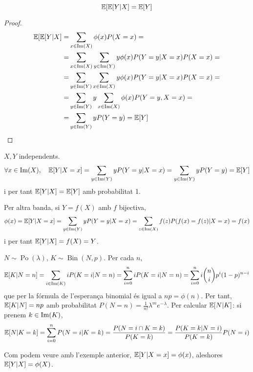 \begin{prop}
    \[\operatorname{\mathbb{E}}[\operatorname{\mathbb{E}}[Y \vert X] = \operatorname{\mathbb{E}}[Y]\]
\end{prop}

\begin{proof}
    \begin{align*}
    \operatorname{\mathbb{E}}[\operatorname{\mathbb{E}}[Y \vert X] = & \sum_{x\in\operatorname{Im}(X)} \phi(x)P(X=x) = \\
    = & \sum_{x\in\operatorname{Im}(X)} \sum_{y\in\operatorname{Im}(Y)} y\phi(x)P(Y=y \vert X=x)P(X=x) = \\
    = & \sum_{y\in\operatorname{Im}(Y)} \sum_{x\in\operatorname{Im}(X)} y\phi(x)P(Y=y \vert X=x)P(X=x) = \\
    = & \sum_{y\in\operatorname{Im}(Y)} y\sum_{x\in\operatorname{Im}(X)} \phi(x)P(Y=y,X=x) = \\
    = & \sum_{y\in\operatorname{Im}(Y)} y P(Y=y) = \operatorname{\mathbb{E}}[Y]
    \end{align*}
\end{proof}

\begin{obs}
    $X,Y$ independents. 
    \[\forall x \in\operatorname{Im}(X),\quad \operatorname{\mathbb{E}}[Y \vert X=x] = \sum_{y\in\operatorname{Im}(Y)} yP(Y=y \vert X=x) = \sum_{y\in\operatorname{Im}(Y)} yP(Y=y) = \operatorname{\mathbb{E}}[Y]\]
    i per tant $\operatorname{\mathbb{E}}[Y \vert X] = \operatorname{\mathbb{E}}[Y]$ amb probabilitat 1.
\end{obs}

\begin{obs}
    Per altra banda, si $Y=f(X)$ amb $f$ bijectiva,
    \[\phi(x) = \operatorname{\mathbb{E}}[Y\vert X=x] = \sum_{y\in\operatorname{Im}(Y)} yP(Y=y \vert X=x) = \sum_{z\in\operatorname{Im}(X)} f(z)P(f(x)=f(z) \vert X=x) = f(x)\]
    i per tant $\operatorname{\mathbb{E}}[Y \vert X] = f(X) = Y$.
\end{obs}

\begin{example}
    $N \sim \operatorname{Po}(\lambda)$, $K \sim \operatorname{Bin}(N,p)$.
    Per cada $n$,
    \[\operatorname{\mathbb{E}}[K \vert N=n] = \sum_{i\in\operatorname{Im}(K)} iP(K=i \vert N=n) = \sum_{i=0}^n iP(K=i \vert N=n) = \sum_{i=0}^n i\binom{n}{i}p^i(1-p)^{n-i}\]
    que per la fórmula de l'esperança binomial és igual a $np = \phi(n)$.
    Per tant, $\operatorname{\mathbb{E}}[K \vert N] = np$ amb probabilitat $P(N=n) = \frac{1}{n!}\lambda^me^{-\lambda}$.
    Per calcular $\operatorname{\mathbb{E}}[N \vert K]$: si prenem $k\in\operatorname{Im}(K)$,
    \[\operatorname{\mathbb{E}}[N|K=k] = \sum_{i=0}^nP(N=i \vert K=k) = \frac{P(N=i \cap K=k)}{P(K=k)} = \frac{P(K=k \vert N=i)}{P(K=k)}P(N=i)\]
\end{example}

\begin{obs}
    Com podem veure amb l'exemple anterior, $\operatorname{\mathbb{E}}[Y \vert X=x] = \phi(x)$, aleshores $\operatorname{\mathbb{E}}[Y \vert X] = \phi(X)$.
\end{obs}


